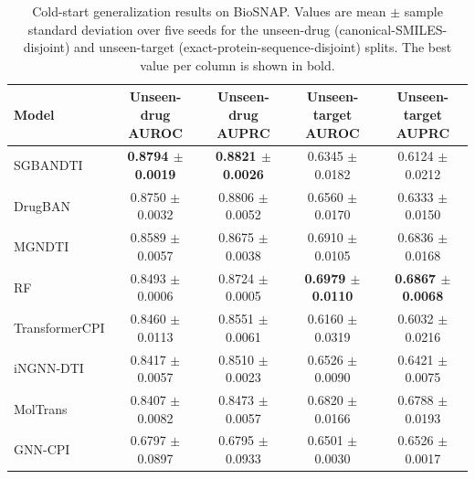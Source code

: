 \documentclass[computers,article,submit,moreauthors]{Definitions/mdpi}
\begin{document}
\begin{table}[H]
\caption{Cold-start generalization results on BioSNAP. Values are mean $\pm$ sample standard deviation over five seeds for the unseen-drug (canonical-SMILES-disjoint) and unseen-target (exact-protein-sequence-disjoint) splits. The best value per column is shown in bold.}
\label{tab:coldstart}
\scriptsize
\setlength{\tabcolsep}{4pt}
\renewcommand{\arraystretch}{1.05}
\begin{tabular*}{\textwidth}{@{\extracolsep{\fill}}lcccc@{}}
\toprule
\textbf{Model} & \textbf{Unseen-drug AUROC} & \textbf{Unseen-drug AUPRC} & \textbf{Unseen-target AUROC} & \textbf{Unseen-target AUPRC} \\
\midrule
SGBANDTI & \textbf{0.8794 $\pm$ 0.0019} & \textbf{0.8821 $\pm$ 0.0026} & 0.6345 $\pm$ 0.0182 & 0.6124 $\pm$ 0.0212 \\
DrugBAN & 0.8750 $\pm$ 0.0032 & 0.8806 $\pm$ 0.0052 & 0.6560 $\pm$ 0.0170 & 0.6333 $\pm$ 0.0150 \\
MGNDTI & 0.8589 $\pm$ 0.0057 & 0.8675 $\pm$ 0.0038 & 0.6910 $\pm$ 0.0105 & 0.6836 $\pm$ 0.0168 \\
RF & 0.8493 $\pm$ 0.0006 & 0.8724 $\pm$ 0.0005 & \textbf{0.6979 $\pm$ 0.0110} & \textbf{0.6867 $\pm$ 0.0068} \\
TransformerCPI & 0.8460 $\pm$ 0.0113 & 0.8551 $\pm$ 0.0061 & 0.6160 $\pm$ 0.0319 & 0.6032 $\pm$ 0.0216 \\
iNGNN-DTI & 0.8417 $\pm$ 0.0057 & 0.8510 $\pm$ 0.0023 & 0.6526 $\pm$ 0.0090 & 0.6421 $\pm$ 0.0075 \\
MolTrans & 0.8407 $\pm$ 0.0082 & 0.8473 $\pm$ 0.0057 & 0.6820 $\pm$ 0.0166 & 0.6788 $\pm$ 0.0193 \\
GNN-CPI & 0.6797 $\pm$ 0.0897 & 0.6795 $\pm$ 0.0933 & 0.6501 $\pm$ 0.0030 & 0.6526 $\pm$ 0.0017 \\
\bottomrule
\end{tabular*}
\end{table}
\end{document}
